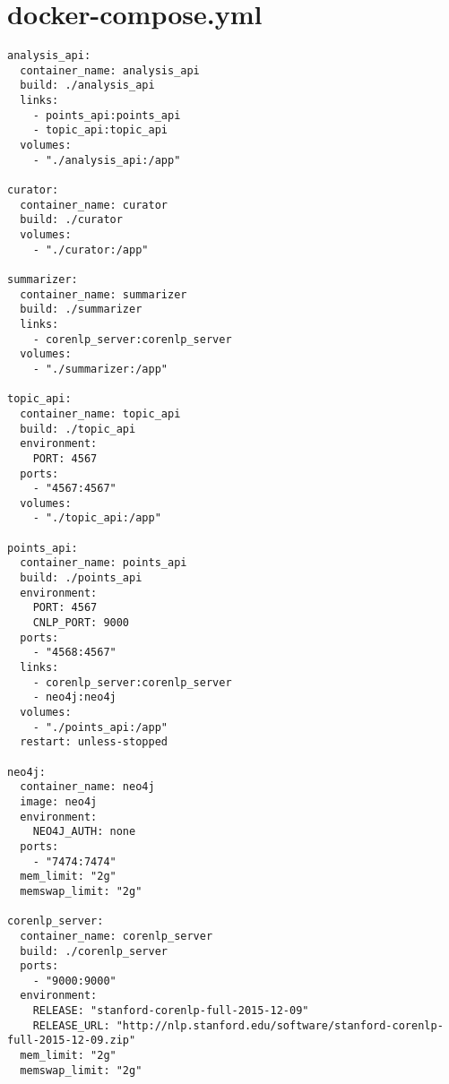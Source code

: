 \documentclass{article}
\begin{document}
\section*{docker-compose.yml}
\begin{verbatim}
analysis_api:
  container_name: analysis_api
  build: ./analysis_api
  links:
    - points_api:points_api
    - topic_api:topic_api
  volumes:
    - "./analysis_api:/app"

curator:
  container_name: curator
  build: ./curator
  volumes:
    - "./curator:/app"

summarizer:
  container_name: summarizer
  build: ./summarizer
  links:
    - corenlp_server:corenlp_server
  volumes:
    - "./summarizer:/app"

topic_api:
  container_name: topic_api
  build: ./topic_api
  environment:
    PORT: 4567
  ports:
    - "4567:4567"
  volumes:
    - "./topic_api:/app"

points_api:
  container_name: points_api
  build: ./points_api
  environment:
    PORT: 4567
    CNLP_PORT: 9000
  ports:
    - "4568:4567"
  links:
    - corenlp_server:corenlp_server
    - neo4j:neo4j
  volumes:
    - "./points_api:/app"
  restart: unless-stopped

neo4j:
  container_name: neo4j
  image: neo4j
  environment:
    NEO4J_AUTH: none
  ports:
    - "7474:7474"
  mem_limit: "2g"
  memswap_limit: "2g"

corenlp_server:
  container_name: corenlp_server
  build: ./corenlp_server
  ports:
    - "9000:9000"
  environment:
    RELEASE: "stanford-corenlp-full-2015-12-09"
    RELEASE_URL: "http://nlp.stanford.edu/software/stanford-corenlp-full-2015-12-09.zip"
  mem_limit: "2g"
  memswap_limit: "2g"


\end{verbatim}
\pagebreak
\end{document}
